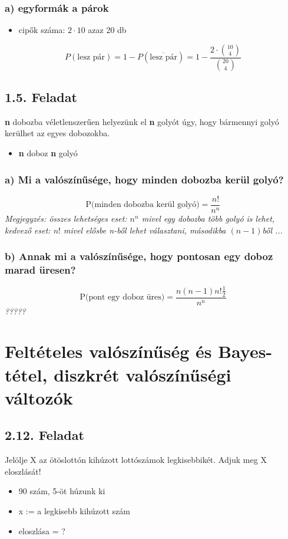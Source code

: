 \documentclass{article}
\begin{document}
\subsubsection*{a) egyformák a párok}
\begin{itemize}
 \item cipők száma: $2 \cdot 10$ azaz 20 db
\end{itemize}
\[ P( \text{lesz pár}) = 1 - P( \overline{\text{lesz pár}}) = 1 -\frac{2 \cdot \binom{10}{4}}{\binom{20}{4}} \]


\subsection*{1.5. Feladat}
 \textbf{n} dobozba véletlenszerűen helyezünk el \textbf{n} golyót úgy, hogy bármennyi golyó kerülhet az egyes dobozokba.
\begin{itemize}
    \item \textbf{n} doboz \textbf{n} golyó
   \end{itemize}
\subsubsection*{a) Mi a valószínűsége, hogy minden dobozba kerül golyó?}
\[ \text{P(minden dobozba kerül golyó)} = \frac{n!}{n^n} \]
\textit{Megjegyzés: összes lehetséges eset: $n^n$ mivel egy dobozba több golyó is lehet, kedvező eset: $n!$ mivel elősbe n-ből lehet választani, másodikba $(n-1)$ből ...}


\subsubsection*{b) Annak mi a valószínűsége, hogy pontosan egy doboz marad üresen?}
\[ \text{P(pont egy doboz üres)} = \frac{n(n-1)n!\frac{1}{2}}{n^n} \]
\textit{?????}

\section{Feltételes valószínűség és Bayes-tétel, diszkrét valószínűségi változók}
\subsection*{2.12. Feladat}
Jelölje X az ötöslottón kihúzott lottószámok legkisebbikét. Adjuk meg X eloszlását!

\begin{itemize}
    \item 90 szám, 5-öt húzunk ki
    \item x := a legkisebb kihúzott szám
    \item eloszlása = ?
\end{itemize}
\end{document}
